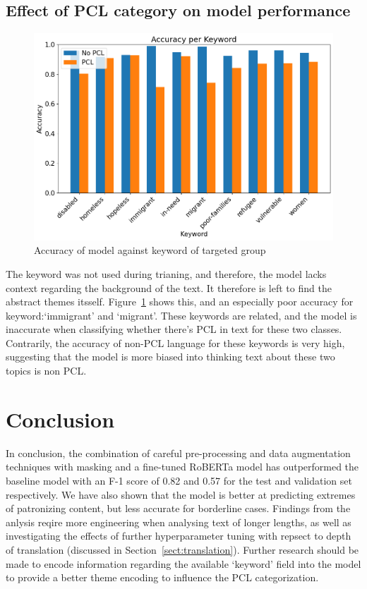 \documentclass[11pt,a4paper]{article}
\begin{document}
\subsection*{Effect of PCL category on model performance}

\begin{figure}[H]
    \centering
    \includegraphics[width=\linewidth]{figures/accuracy_per_pcl_type_keyword.png}
    \caption{Accuracy of model against keyword of targeted group}
    \label{fig:accuracy-keyword}
\end{figure}


The keyword was not used during trianing, and therefore, the model lacks context regarding the background of the text. It therefore is left to find the abstract themes itsself. Figure~\ref{fig:accuracy-keyword} shows this, and an especially poor accuracy for keyword:`immigrant' and `migrant'. These keywords are related, and the model is inaccurate when classifying whether there's PCL in text for these two classes. Contrarily, the accuracy of non-PCL language for these keywords is very high, suggesting that the model is more biased into thinking text about these two topics is non PCL.

\section{Conclusion}

In conclusion, the combination of careful pre-processing and data augmentation techniques with masking and a fine-tuned RoBERTa model has outperformed the baseline model with an F-1 score of 0.82 and 0.57 for the test and validation set respectively. We have also shown that the model is better at predicting extremes of patronizing content, but less accurate for borderline cases. Findings from the anlysis reqire more engineering when analysing text of longer lengths, as well as investigating the effects of further hyperparameter tuning with repsect to depth of translation (discussed in Section~\ref{sect:translation}). Further research should be made to encode information regarding the available `keyword' field into the model to provide a better theme encoding to influence the PCL categorization.
\end{document}
